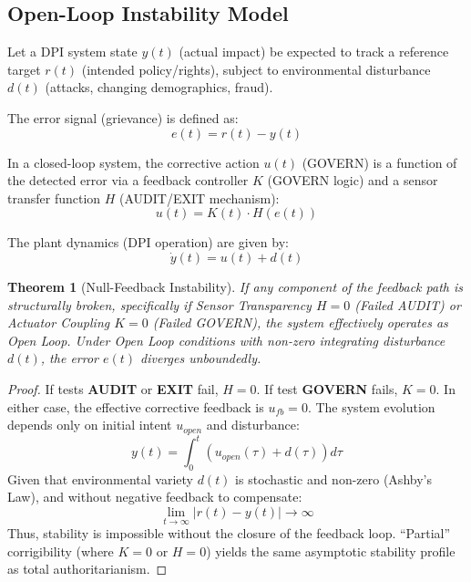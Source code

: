 \documentclass{article}
\newtheorem{theorem}{Theorem}
\begin{document}
\subsection{Open-Loop Instability Model}

Let a DPI system state $y(t)$ (actual impact) be expected to track a reference target $r(t)$ (intended policy/rights), subject to environmental disturbance $d(t)$ (attacks, changing demographics, fraud).

The error signal (grievance) is defined as:
\begin{equation}
e(t) = r(t) - y(t)
\end{equation}

In a closed-loop system, the corrective action $u(t)$ (GOVERN) is a function of the detected error via a feedback controller $K$ (GOVERN logic) and a sensor transfer function $H$ (AUDIT/EXIT mechanism):
\begin{equation}
u(t) = K(t) \cdot H(e(t))
\end{equation}

The plant dynamics (DPI operation) are given by:
\begin{equation}
\dot{y}(t) = u(t) + d(t)
\end{equation}

\begin{theorem}[Null-Feedback Instability]
If any component of the feedback path is structurally broken, specifically if Sensor Transparency $H=0$ (Failed AUDIT) or Actuator Coupling $K=0$ (Failed GOVERN), the system effectively operates as Open Loop. Under Open Loop conditions with non-zero integrating disturbance $d(t)$, the error $e(t)$ diverges unboundedly.
\end{theorem}

\begin{proof}
If tests \textbf{AUDIT} or \textbf{EXIT} fail, $H=0$.
If test \textbf{GOVERN} fails, $K=0$.
In either case, the effective corrective feedback is $u_{fb} = 0$.
The system evolution depends only on initial intent $u_{open}$ and disturbance:
\begin{equation}
y(t) = \int_0^t (u_{open}(\tau) + d(\tau)) d\tau
\end{equation}
Given that environmental variety $d(t)$ is stochastic and non-zero (Ashby's Law), and without negative feedback to compensate:
\begin{equation}
\lim_{t \to \infty} |r(t) - y(t)| \to \infty
\end{equation}
Thus, stability is impossible without the closure of the feedback loop. ``Partial'' corrigibility (where $K=0$ or $H=0$) yields the same asymptotic stability profile as total authoritarianism.
\end{proof}
\end{document}
